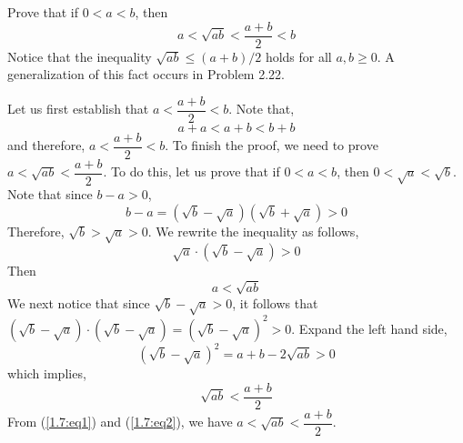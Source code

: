 \begin{pr}
  Prove that if $0<a<b$, then
  \begin{equation*}
    a<\sqrt{ab}<\frac{a+b}{2}<b
  \end{equation*}
  Notice that the inequality $\sqrt{ab}\leq(a+b)/2$ holds
  for all $a,b\geq0$. A generalization of this fact
  occurs in Problem 2.22. %
\end{pr}
\begin{solution}
  Let us first establish that $a<\dfrac{a+b}{2}<b$. Note
  that,
  \begin{equation*}
    a+a<a+b<b+b
  \end{equation*}
  and therefore, $a<\dfrac{a+b}{2}<b$. To finish the proof,
  we need to prove ${a<\sqrt{ab}<\dfrac{a+b}{2}}$. To do this,
  let us prove that if $0<a<b$, then ${0<\sqrt{a}<\sqrt{b}}$.
  Note that since $b-a>0$,
  \begin{equation*}
    b-a=(\sqrt{b}-\sqrt{a})(\sqrt{b}+\sqrt{a})>0
  \end{equation*}
  Therefore, $\sqrt{b}>\sqrt{a}>0$. We rewrite the inequality
  as follows,
  \begin{equation*}
    \sqrt{a}\cdot(\sqrt{b}-\sqrt{a})>0
  \end{equation*}
  Then
  \begin{equation}
    a<\sqrt{ab} \label{1.7:eq1}
  \end{equation}
  We next notice that since ${\sqrt{b}-\sqrt{a}>0}$, it follows
  that \\$(\sqrt{b}-\sqrt{a})\cdot(\sqrt{b}-\sqrt{a})
  =(\sqrt{b}-\sqrt{a})^2>0$. Expand the left hand side,
  \begin{equation*}
    (\sqrt{b}-\sqrt{a})^2=a+b-2\sqrt{ab}>0
  \end{equation*}
  which implies,
  \begin{equation}
    \sqrt{ab}<\frac{a+b}{2} \label{1.7:eq2}
  \end{equation}
  From (\ref{1.7:eq1}) and (\ref{1.7:eq2}), we have
  $a<\sqrt{ab}<\dfrac{a+b}{2}$.
\end{solution}

